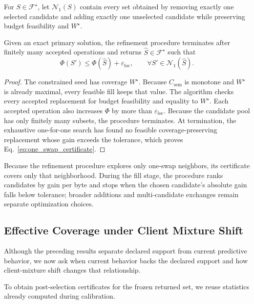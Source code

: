 For $S\in\mathcal F^\star$, let $\mathcal N_1(S)$ contain every set obtained
by removing exactly one selected candidate and adding exactly one unselected
candidate while preserving budget feasibility and $W^\star$.

\begin{theorem}
\label{thm:local_refinement}
Given an exact primary solution, the refinement procedure
terminates after finitely many accepted operations and returns
$\widehat S\in\mathcal F^\star$ such that
\begin{equation}
\Phi(S')\le\Phi(\widehat S)+\varepsilon_{\mathrm{loc}},
\qquad
\forall S'\in\mathcal N_1(\widehat S).
\label{eq:one_swap_certificate}
\end{equation}
\end{theorem}

\begin{proof}
The constrained seed has coverage $W^\star$. Because
$C_{\mathrm{sem}}$ is monotone and $W^\star$ is already maximal, every
feasible fill keeps that value. The algorithm checks every
accepted replacement for budget feasibility and equality to $W^\star$.
Each accepted operation also increases $\Phi$ by more than
$\varepsilon_{\mathrm{loc}}$. Because the candidate pool has only finitely
many subsets, the procedure terminates. At termination, the exhaustive
one-for-one search has found no feasible coverage-preserving replacement
whose gain exceeds the tolerance, which proves
Eq.~\ref{eq:one_swap_certificate}.
\end{proof}

Because the refinement procedure explores only one-swap neighbors, its
certificate covers only that neighborhood. During the fill stage, the
procedure ranks candidates by gain per byte and stops when the chosen
candidate's absolute gain falls below tolerance; broader additions and
multi-candidate exchanges remain separate optimization choices.

\subsection{Effective Coverage under Client Mixture Shift}

Although the preceding results separate declared support from current
predictive behavior, we now ask when current behavior backs the declared
support and how client-mixture shift changes that relationship.

To obtain post-selection certificates for the frozen returned set, we reuse
statistics already computed during calibration.

